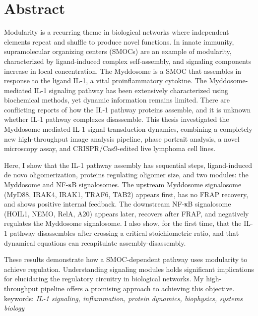 \cleardoublepage
{}
\chapter*{Abstract}
\sectionmark{}
Modularity is a recurring theme in biological networks where independent elements repeat and shuffle to produce novel functions. In innate immunity, supramolecular organizing centers (SMOCs) are an example of modularity, characterized by ligand-induced complex self-assembly, and signaling components increase in local concentration. The Myddosome is a SMOC that assembles in response to the ligand IL-1, a vital proinflammatory cytokine. The Myddosome-mediated IL-1 signaling pathway has been extensively characterized using biochemical methods, yet dynamic information remains limited. There are conflicting reports of how the IL-1 pathway proteins assemble, and it is unknown whether IL-1 pathway complexes disassemble. This thesis investigated the Myddosome-mediated IL-1 signal transduction dynamics, combining a completely new high-throughput image analysis pipeline, phase portrait analysis, a novel microscopy assay, and CRISPR/Cas9-edited live lymphoma cell lines.

Here, I show that the IL-1 pathway assembly has sequential steps, ligand-induced de novo oligomerization, proteins regulating oligomer size, and two modules: the Myddosome and NF-κB signalosomes. The upstream Myddosome signalosome (MyD88, IRAK4, IRAK1, TRAF6, TAB2) appears first, has no FRAP recovery, and shows positive internal feedback. The downstream NF-κB signalosome (HOIL1, NEMO, RelA, A20) appears later, recovers after FRAP, and negatively regulates the Myddosome signalosome. I also show, for the first time, that the IL-1 pathway disassembles after crossing a critical stoichiometric ratio, and that dynamical equations can recapitulate assembly-disassembly.

These results demonstrate how a SMOC-dependent pathway uses modularity to achieve regulation. Understanding signaling modules holds significant implications for elucidating the regulatory circuitry in biological networks. My high-throughput pipeline offers a promising approach to achieving this objective.
\vspace{1.0cm}
\\
keywords: \emph{IL-1 signaling, inflammation, protein dynamics, biophysics, systems biology}

